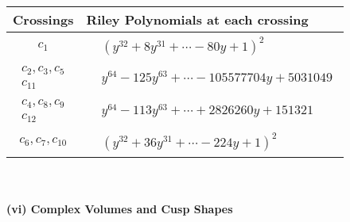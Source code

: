\documentclass[1p]{elsarticle_modified}
\theoremstyle{definition}
\begin{document}
\begin{tabular}{m{50pt}|m{274pt}}
Crossings & \hspace{64pt}Riley Polynomials at each crossing \\
\hline $$\begin{aligned}c_{1}\end{aligned}$$&$\begin{aligned}
&(y^{32}+8 y^{31}+\cdots-80 y+1)^{2}
\end{aligned}$\\
\hline $$\begin{aligned}c_{2},c_{3},c_{5}\\c_{11}\end{aligned}$$&$\begin{aligned}
&y^{64}-125 y^{63}+\cdots-105577704 y+5031049
\end{aligned}$\\
\hline $$\begin{aligned}c_{4},c_{8},c_{9}\\c_{12}\end{aligned}$$&$\begin{aligned}
&y^{64}-113 y^{63}+\cdots+2826260 y+151321
\end{aligned}$\\
\hline $$\begin{aligned}c_{6},c_{7},c_{10}\end{aligned}$$&$\begin{aligned}
&(y^{32}+36 y^{31}+\cdots-224 y+1)^{2}
\end{aligned}$\\
\hline
\end{tabular}\\~\\
\newpage\flushleft \textbf{(vi) Complex Volumes and Cusp Shapes}
\end{document}
